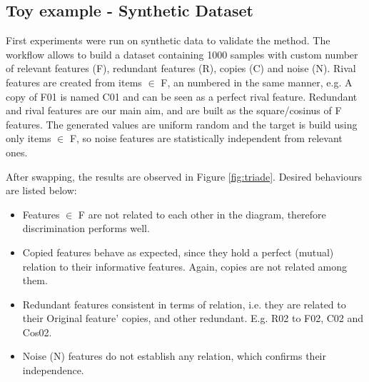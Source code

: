 \subsection{Toy example - Synthetic Dataset}
\label{section:results-toy}
First experiments were run on synthetic data to validate the method. The workflow allows to build a dataset containing 1000 samples with custom number of relevant features (F), redundant features (R), copies (C) and noise (N). Rival features are created from items $\in$ F, an numbered in the same manner, e.g. A copy of F01 is named C01 and can be seen as a perfect rival feature. Redundant and rival features are our main aim, and are built as the square/cosinus of F features. The generated values are uniform random and the target is build using only items $\in$ F, so noise features are statistically independent from relevant ones.

After swapping, the results are observed in Figure \ref{fig:triade}. Desired behaviours are listed below:

\begin{itemize}
    \item Features $\in$ F are not related to each other in the diagram, therefore discrimination performs well.
    \item Copied features behave as expected, since they hold a perfect (mutual) relation to their informative features. Again, copies are not related among them.
    \item Redundant features consistent in terms of relation, i.e. they are related to their Original feature’ copies, and other redundant. E.g. R02 to F02, C02 and Cos02.
    \item Noise (N) features do not establish any relation, which confirms their independence.
\end{itemize}

